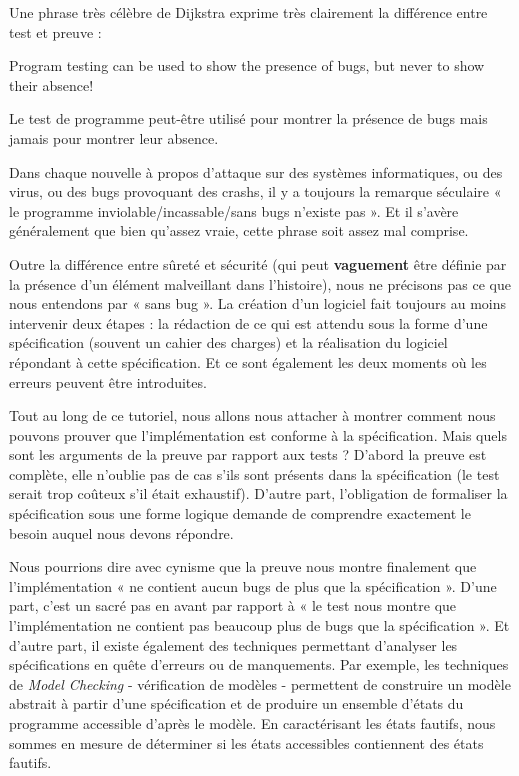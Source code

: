 Une phrase très célèbre de Dijkstra exprime très clairement la différence entre
test et preuve :



\begin{Quotation}[Dijkstra]
Program testing can be used to show the presence of bugs, but never to show 
their absence!
\end{Quotation}



Le test de programme peut-être utilisé pour montrer la présence de bugs mais 
jamais pour montrer leur absence.





Dans chaque nouvelle à propos d'attaque sur des systèmes informatiques, ou 
des virus, ou des bugs provoquant des crashs, il y a toujours la remarque 
séculaire « le programme inviolable/incassable/sans bugs n'existe pas ». Et 
il s'avère généralement que bien qu'assez vraie, cette phrase soit assez 
mal comprise.



Outre la différence entre sûreté et sécurité (qui peut \textbf{vaguement} être 
définie par la présence d'un élément malveillant dans l'histoire), nous ne 
précisons pas ce que nous entendons par « sans bug ». La création d'un logiciel
fait toujours au moins intervenir deux étapes : la rédaction de ce qui est
attendu sous la forme d'une spécification (souvent un cahier des charges) 
et la réalisation du logiciel répondant à cette spécification. Et ce sont 
également les deux moments où les erreurs peuvent être introduites.



Tout au long de ce tutoriel, nous allons nous attacher à montrer comment nous 
pouvons prouver que l'implémentation est conforme à la spécification. Mais 
quels sont les arguments de la preuve par rapport aux tests ? D'abord la preuve
est complète, elle n'oublie pas de cas s'ils sont présents dans la spécification 
(le test serait trop coûteux s'il était exhaustif). D'autre part, l'obligation 
de formaliser la spécification sous une forme logique demande de comprendre 
exactement le besoin auquel nous devons répondre.



Nous pourrions dire avec cynisme que la preuve nous montre finalement que 
l'implémentation « ne contient aucun bugs de plus que la spécification ». D'une 
part, c'est un sacré pas en avant par rapport à « le test nous montre que 
l'implémentation ne contient pas beaucoup plus de bugs que la spécification ». 
Et d'autre part, il existe également des techniques permettant d'analyser les 
spécifications en quête d'erreurs ou de manquements. Par exemple, les techniques
de \textit{Model Checking} - vérification de modèles - permettent de construire un modèle
abstrait à partir d'une spécification et de produire un ensemble d'états du 
programme accessible d'après le modèle. En caractérisant les états fautifs, nous
sommes en mesure de déterminer si les états accessibles contiennent des états
fautifs.




